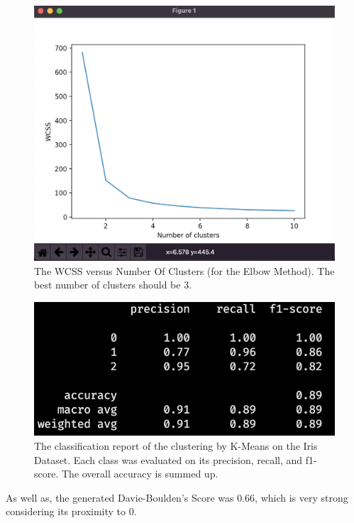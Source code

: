 \documentclass[10pt,twocolumn]{article}
\begin{document}
\begin{figure}[H]
  \centering
  \includegraphics[scale=0.3]{iris_elbow.png}
  \vspace{20px}
  \caption{The WCSS versus Number Of Clusters (for the Elbow Method). The best number of clusters should be 3.}
  \label{iris_elbow}
\end{figure}

\begin{figure}[h!]
  \centering
  \includegraphics[scale=0.3]{class_report_iris.png}
  \vspace{20px}
  \caption{The classification report of the clustering by K-Means on the Iris Dataset. Each class was evaluated on its precision, recall, and f1-score. The overall accuracy is summed up.}
  \label{class_report_iris}
\end{figure}

As well as, the generated Davie-Boulden's Score was 0.66, which is very strong considering its proximity to 0.
\end{document}
